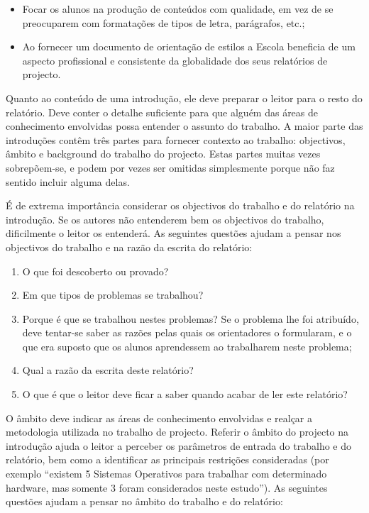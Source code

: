 \begin{itemize}
 \item Focar os alunos na produção de conteúdos com qualidade, em vez de se preocuparem com formatações de tipos de letra, parágrafos, etc.;
 \item Ao fornecer um documento de orientação de estilos a Escola beneficia de um aspecto profissional e consistente da globalidade dos seus relatórios de projecto.
\end{itemize}


Quanto ao conteúdo de uma introdução, ele deve preparar o leitor para o resto do relatório. Deve conter o detalhe suficiente para que alguém das áreas de conhecimento envolvidas possa entender o assunto do trabalho. A maior parte das introduções contêm três partes para fornecer contexto ao trabalho: objectivos, âmbito e background do trabalho do projecto. Estas partes muitas vezes sobrepõem-se, e podem por vezes ser omitidas simplesmente porque não faz sentido incluir alguma delas.

É de extrema importância considerar os objectivos do trabalho e do relatório na introdução. Se os autores não entenderem bem os objectivos do trabalho, dificilmente o leitor os entenderá. As seguintes questões ajudam a pensar nos objectivos do trabalho e na razão da escrita do relatório:

\begin{enumerate}
 \item O que foi descoberto ou provado?
 \item Em que tipos de problemas se trabalhou?
 \item Porque é que se trabalhou nestes problemas? Se o problema lhe foi atribuído, deve tentar-se saber as razões pelas quais os orientadores o formularam, e o que era suposto que os alunos aprendessem ao trabalharem neste problema;
 \item Qual a razão da escrita deste relatório?
 \item O que é que o leitor deve ficar a saber quando acabar de ler este relatório?
\end{enumerate}


O âmbito deve indicar as áreas de conhecimento envolvidas e realçar a metodologia utilizada no trabalho de projecto. Referir o âmbito do projecto na introdução ajuda o leitor a perceber os parâmetros de entrada do trabalho e do relatório, bem como a identificar as principais restrições consideradas (por exemplo “existem 5 Sistemas Operativos para trabalhar com determinado hardware, mas somente 3 foram considerados neste estudo”). As seguintes questões ajudam a pensar no âmbito do trabalho e do relatório:

